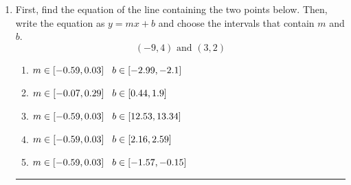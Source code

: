 \documentclass[14pt]{extbook}
\newcommand{\litem}[1]{\item#1\hspace*{-1cm}\rule{\textwidth}{0.4pt}}
\begin{document}
\begin{enumerate}
{\begin{enumerate}[label=\Alph*.]
\end{enumerate} }
\litem{
First, find the equation of the line containing the two points below. Then, write the equation as $ y=mx+b $ and choose the intervals that contain $m$ and $b$.\[ (-9, 4) \text{ and } (3, 2) \]\begin{enumerate}[label=\Alph*.]
\item \( m \in [-0.59, 0.03] \hspace*{3mm} b \in [-2.99, -2.1] \)
\item \( m \in [-0.07, 0.29] \hspace*{3mm} b \in [0.44, 1.9] \)
\item \( m \in [-0.59, 0.03] \hspace*{3mm} b \in [12.53, 13.34] \)
\item \( m \in [-0.59, 0.03] \hspace*{3mm} b \in [2.16, 2.59] \)
\item \( m \in [-0.59, 0.03] \hspace*{3mm} b \in [-1.57, -0.15] \)

\end{enumerate} }
\end{enumerate}
\end{document}
